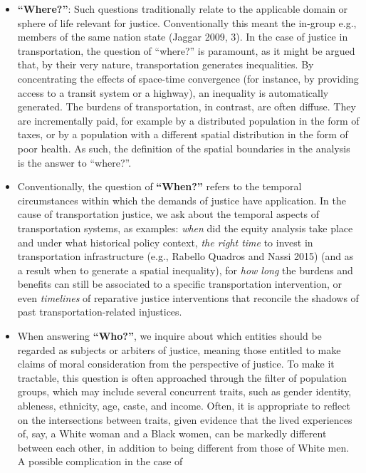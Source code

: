 \documentclass[12pt, oneside]{report}
\begin{document}
\begin{itemize}
\item
  \textbf{``Where?''}: Such questions traditionally relate to the
  applicable domain or sphere of life relevant for justice.
  Conventionally this meant the in-group e.g., members of the same
  nation state (Jaggar 2009, 3). In the case of justice in
  transportation, the question of ``where?'' is paramount, as it might
  be argued that, by their very nature, transportation generates
  inequalities. By concentrating the effects of space-time convergence
  (for instance, by providing access to a transit system or a highway),
  an inequality is automatically generated. The burdens of
  transportation, in contrast, are often diffuse. They are incrementally
  paid, for example by a distributed population in the form of taxes, or
  by a population with a different spatial distribution in the form of
  poor health. As such, the definition of the spatial boundaries in the
  analysis is the answer to ``where?''.
\item
  Conventionally, the question of \textbf{``When?''} refers to the
  temporal circumstances within which the demands of justice have
  application. In the cause of transportation justice, we ask about the
  temporal aspects of transportation systems, as examples: \emph{when}
  did the equity analysis take place and under what historical policy
  context, \emph{the right time} to invest in transportation
  infrastructure (e.g., Rabello Quadros and Nassi 2015) (and as a result
  when to generate a spatial inequality), for \emph{how long} the
  burdens and benefits can still be associated to a specific
  transportation intervention, or even \emph{timelines} of reparative
  justice interventions that reconcile the shadows of past
  transportation-related injustices.
\item
  When answering \textbf{``Who?''}, we inquire about which entities
  should be regarded as subjects or arbiters of justice, meaning those
  entitled to make claims of moral consideration from the perspective of
  justice. To make it tractable, this question is often approached
  through the filter of population groups, which may include several
  concurrent traits, such as gender identity, ableness, ethnicity, age,
  caste, and income. Often, it is appropriate to reflect on the
  intersections between traits, given evidence that the lived
  experiences of, say, a White woman and a Black women, can be markedly
  different between each other, in addition to being different from
  those of White men. A possible complication in the case of

\end{itemize}
\end{document}

